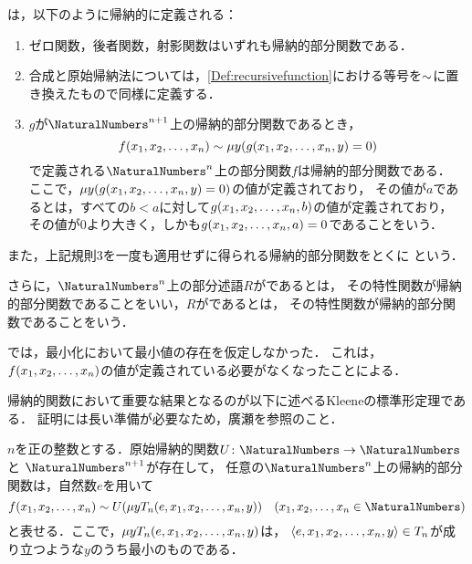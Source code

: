 \begin{Def} \label{Def:partialrecursivefunction}
	は，以下のように帰納的に定義される：
	\begin{enumerate}
		\item ゼロ関数，後者関数，射影関数はいずれも帰納的部分関数である．
		\item 合成と原始帰納法については，\cref{Def:recursivefunction}における等号を\(\sim\)に置き換えたもので同様に定義する．
		\item \(g\)が\(\NaturalNumbers^{n+1}\)上の帰納的部分関数であるとき，
		      \begin{equation}
			      \apply{f}{x_1, x_2, \dots, x_n} \partialequal \muoperator y \paren{\apply{g}{x_1, x_2, \dots, x_n, y} = 0}
			      \label{eq:partialequalminimization}
		      \end{equation}
		      で定義される\(\NaturalNumbers^n\)上の部分関数\(f\)は帰納的部分関数である．
		      ここで，\(\muoperator y \paren{\apply{g}{x_1, x_2, \dots, x_n, y} = 0}\)の値が定義されており，
		      その値が\(a\)であるとは，すべての\(b < a\)に対して\(\apply{g}{x_1, x_2, \dots, x_n, b}\)の値が定義されており，
		      その値が0より大きく，しかも\(\apply{g}{x_1, x_2, \dots, x_n, a} = 0\)であることをいう．
	\end{enumerate}

	また，上記規則3を一度も適用せずに得られる帰納的部分関数をとくに
	という．

	さらに，\(\NaturalNumbers^n\)上の部分述語\(R\)がであるとは，
	その特性関数が帰納的部分関数であることをいい，\(R\)がであるとは，
	その特性関数が帰納的部分関数であることをいう．
\end{Def}

では，最小化において最小値の存在を仮定しなかった．
これは，\(\apply{f}{x_1, x_2, \dots, x_n}\)の値が定義されている必要がなくなったことによる．

帰納的関数において重要な結果となるのが以下に述べるKleeneの標準形定理である．
証明には長い準備が必要なため，廣瀬\cite{hirose2024}を参照のこと．

\begin{Thm}[Kleeneの標準形定理]
	\(n\)を正の整数とする．原始帰納的関数\(U \colon \NaturalNumbers \to \NaturalNumbers\)と
	\(\NaturalNumbers^{n+1}\)が存在して，
	任意の\(\NaturalNumbers^n\)上の帰納的部分関数は，自然数\(e\)を用いて
	\begin{equation}
		\apply{f}{x_1, x_2, \dots, x_n} \partialequal \apply{U}{\muoperator y \apply{T_n}{e, x_1, x_2, \dots, x_n, y}}
		\quad \text{(\(x_1, x_2, \dots, x_n \in \NaturalNumbers\))}
		\label{eq:kleenenormaltheorem}
	\end{equation}
	と表せる．ここで，\(\muoperator y \apply{T_n}{e, x_1, x_2, \dots, x_n, y}\)は，
	\(\langle e, x_1, x_2, \dots, x_n, y \rangle \in T_n\)が成り立つような\(y\)のうち最小のものである．
\end{Thm}